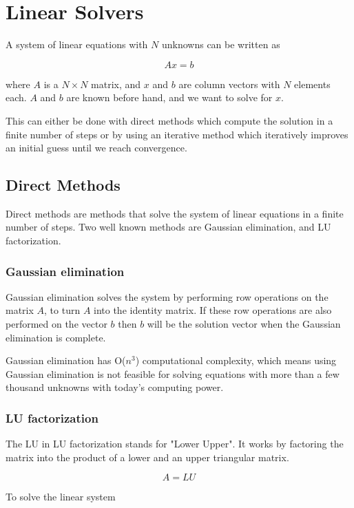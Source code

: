 \section{Linear Solvers}

A system of linear equations with $N$ unknowns can be written as 

$$Ax = b$$

where $A$ is a $N \times N$ matrix, and $x$ and $b$ are column vectors with $N$ 
elements each. $A$ and $b$ are known before hand, and we want to solve for $x$.

This can either be done with direct methods which compute the solution in a finite 
number of steps or by using an iterative method which iteratively improves an initial 
guess until we reach convergence. 

\subsection{Direct Methods}

Direct methods are methods that solve the system of linear equations in a finite
number of steps. Two well known methods are Gaussian elimination, and LU factorization.

\subsubsection{Gaussian elimination}

Gaussian elimination solves the system by performing row operations on the matrix 
$A$, to turn $A$ into the identity matrix. If these row operations are also performed 
on the vector $b$ then $b$ will be the solution vector when the Gaussian elimination 
is complete.

Gaussian elimination has O($n^3$) computational complexity, which means using 
Gaussian elimination is not feasible for solving equations with more than a few 
thousand unknowns with today's computing power.

\subsubsection{LU factorization}

The LU in LU factorization stands for "Lower Upper". It works by factoring the 
matrix into the product of a lower and an upper triangular matrix. 

$$A = LU$$

To solve the linear system 

